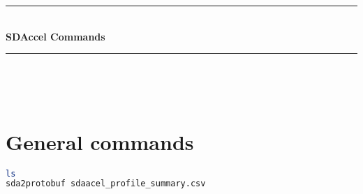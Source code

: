 \documentclass[12pt]{article} %
\begin{document}

\begin{titlepage}

\newcommand{\HRule}{\rule{\linewidth}{0.5mm}} %

\center %

\HRule \\[0.4cm]
{ \huge \bfseries SDAccel Commands}\\[0.4cm] %
\HRule \\[1.5cm]

\begin{minipage}{0.4\textwidth}
     \\ 
    \vspace{2em}
    \centering {\large \today}
\end{minipage}

\end{titlepage}




\section{General commands} %
\begin{lstlisting}[language=bash]
ls
sda2protobuf sdaacel_profile_summary.csv

\end{lstlisting}





\end{document}

